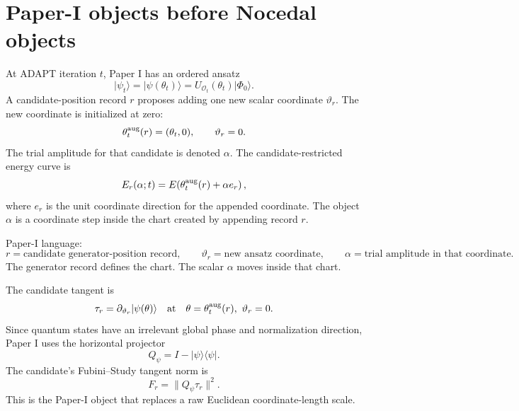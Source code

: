 \documentclass[10pt,twocolumn]{article}
\newcommand{\ket}[1]{\lvert #1\rangle}
\newcommand{\bra}[1]{\langle #1\rvert}
\begin{document}
\section{Paper-I objects before Nocedal objects}

At ADAPT iteration \(t\), Paper I has an ordered ansatz
\begin{equation}
\ket{\psi_t}=\ket{\psi(\theta_t)}
=U_{\mathcal O_t}(\theta_t)\ket{\Phi_0}.
\label{eq:psi_t}
\end{equation}
A candidate-position record \(r\) proposes adding one new scalar coordinate \(\vartheta_r\). The new coordinate is initialized at zero:
\begin{equation}
\theta_t^{\rm aug}(r)=(\theta_t,0),
\qquad
\vartheta_r=0.
\label{eq:augmented_chart}
\end{equation}
The trial amplitude for that candidate is denoted \(\alpha\). The candidate-restricted energy curve is
\begin{equation}
E_r(\alpha;t)
=E\!\left(\theta_t^{\rm aug}(r)+\alpha e_r\right),
\label{eq:Er_curve}
\end{equation}
where \(e_r\) is the unit coordinate direction for the appended coordinate. The object \(\alpha\) is a coordinate step inside the chart created by appending record \(r\).

\begin{paperbox}
Paper-I language:
\[
r=\text{candidate generator-position record},
\qquad
\vartheta_r=\text{new ansatz coordinate},
\qquad
\alpha=\text{trial amplitude in that coordinate}.
\]
The generator record defines the chart. The scalar \(\alpha\) moves inside that chart.
\end{paperbox}

The candidate tangent is
\begin{equation}
\tau_r
=\partial_{\vartheta_r}\ket{\psi(\theta)}
\quad\text{at}\quad
\theta=\theta_t^{\rm aug}(r),\ \vartheta_r=0.
\label{eq:tau_r_def}
\end{equation}
Since quantum states have an irrelevant global phase and normalization direction, Paper I uses the horizontal projector
\begin{equation}
Q_\psi=I-\ket{\psi}\bra{\psi}.
\label{eq:Qpsi}
\end{equation}
The candidate's Fubini--Study tangent norm is
\begin{equation}
F_r=\|Q_\psi\tau_r\|^2.
\label{eq:F_of_r}
\end{equation}
This is the Paper-I object that replaces a raw Euclidean coordinate-length scale.
\end{document}
